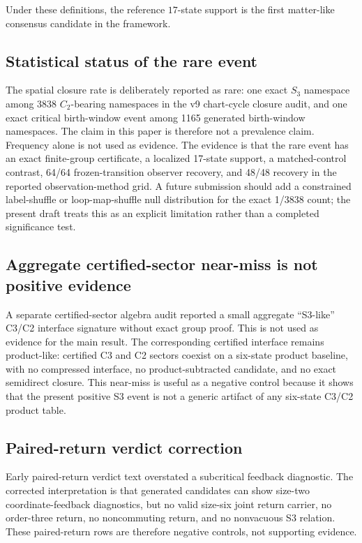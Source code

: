 \documentclass[11pt]{article}
\begin{document}
Under these definitions, the reference $17$-state support is the first matter-like consensus candidate in the framework.


\subsection*{Statistical status of the rare event}
The spatial closure rate is deliberately reported as rare: one exact \(S_3\) namespace among
3838 \(C_2\)-bearing namespaces in the v9 chart-cycle closure audit, and one exact critical
birth-window event among 1165 generated birth-window namespaces.  The claim in this paper is
therefore not a prevalence claim.  Frequency alone is not used as evidence.  The evidence is
that the rare event has an exact finite-group certificate, a localized 17-state support, a
matched-control contrast, 64/64 frozen-transition observer recovery, and 48/48 recovery in the
reported observation-method grid.  A future submission should add a constrained label-shuffle
or loop-map-shuffle null distribution for the exact 1/3838 count; the present draft treats this
as an explicit limitation rather than a completed significance test.


\subsection{Aggregate certified-sector near-miss is not positive evidence}
A separate certified-sector algebra audit reported a small aggregate ``S3-like'' C3/C2 interface signature without exact group proof.  This is not used as evidence for the main result.  The corresponding certified interface remains product-like: certified C3 and C2 sectors coexist on a six-state product baseline, with no compressed interface, no product-subtracted candidate, and no exact semidirect closure.  This near-miss is useful as a negative control because it shows that the present positive S3 event is not a generic artifact of any six-state C3/C2 product table.

\subsection{Paired-return verdict correction}
Early paired-return verdict text overstated a subcritical feedback diagnostic.  The corrected interpretation is that generated candidates can show size-two coordinate-feedback diagnostics, but no valid size-six joint return carrier, no order-three return, no noncommuting return, and no nonvacuous S3 relation.  These paired-return rows are therefore negative controls, not supporting evidence.
\end{document}
